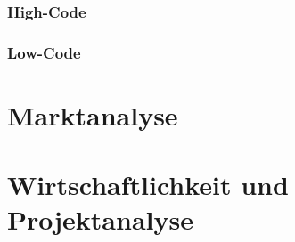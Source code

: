 \documentclass[a4paper, 12pt, oneside]{scrbook}
\begin{document}
		
			\subsubsection{High-Code}
			
			
			
			
			
			
			\subsubsection{Low-Code}
			
			
			
	
	\section{Marktanalyse}
	
	
	\section{Wirtschaftlichkeit und Projektanalyse}
	
\end{document}
